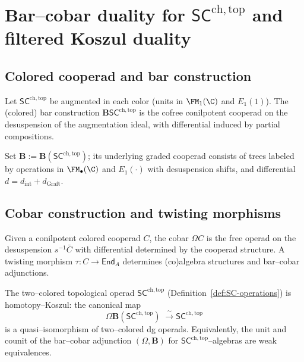 \section{Bar–cobar duality for $\mathsf{SC}^{\mathrm{ch,top}}$ and filtered Koszul duality}
\label{sec:bar-cobar}

\subsection{Colored cooperad and bar construction}
\label{subsec:bar}
Let $\mathsf{SC}^{\mathrm{ch,top}}$ be augmented in each color (units in $\FM_1(\C)$ and $E_1(1)$).
The (colored) bar construction $\mathbf B\mathsf{SC}^{\mathrm{ch,top}}$ is the cofree conilpotent cooperad on the desuspension of the augmentation ideal, with differential induced by partial compositions.

\begin{definition}
\label{def:bar}
Set $\mathbf B := \mathbf B(\mathsf{SC}^{\mathrm{ch,top}})$; its underlying graded cooperad consists of trees labeled by operations in $\FM_\bullet(\C)$ and $E_1(\cdot)$ with desuspension shifts, and differential $d=d_{\mathrm{int}}+d_{\mathrm{Graft}}$.
\end{definition}

\subsection{Cobar construction and twisting morphisms}
\label{subsec:cobar}
Given a conilpotent colored cooperad $C$, the cobar $\Omega C$ is the free operad on the desuspension $s^{-1}\bar{C}$ with differential determined by the cooperad structure.
A twisting morphism $\tau: C\to \mathsf{End}_A$ determines (co)algebra structures and bar–cobar adjunctions.

\begin{theorem}
\label{thm:homotopy-Koszul}
The two--colored topological operad $\mathsf{SC}^{\mathrm{ch,top}}$
(Definition~\textup{\ref{def:SC-operations}}) is homotopy--Koszul: the canonical
map
\[
 \Omega\mathbf{B}(\mathsf{SC}^{\mathrm{ch,top}})
 \;\xrightarrow{\;\sim\;}
 \mathsf{SC}^{\mathrm{ch,top}}
\]
is a quasi--isomorphism of two--colored dg operads.
Equivalently, the unit and counit of the bar--cobar adjunction
$(\Omega,\mathbf B)$ for $\mathsf{SC}^{\mathrm{ch,top}}$--algebras are weak
equivalences.
\end{theorem}

